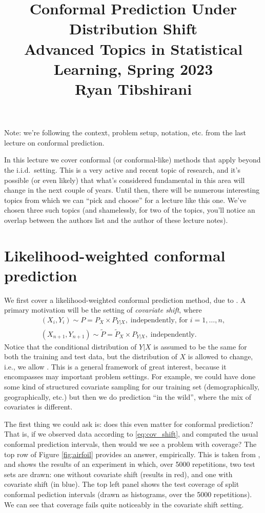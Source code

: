 \documentclass{article}
\title{Conformal Prediction Under Distribution Shift \\ \smallskip
\large Advanced Topics in Statistical Learning, Spring 2023 \\ \smallskip
Ryan Tibshirani }
\date{}
\begin{document}
\maketitle
\RaggedRight
\vspace{-50pt}

Note: we're following the context, problem setup, notation, etc. from the last
lecture on conformal prediction.

In this lecture we cover conformal (or conformal-like) methods that apply beyond
the i.i.d.\ setting. This is a very active and recent topic of research, and
it's possible (or even likely) that what's considered fundamental in this area  
will change in the next couple of years. Until then, there will be numerous
interesting topics from which we can ``pick and choose'' for a lecture like this
one. We've chosen three such topics (and shamelessly, for two of the topics,
you'll notice an overlap between the authors list and the author of these
lecture notes).  

\section{Likelihood-weighted conformal prediction}

We first cover a likelihood-weighted conformal prediction method, due to
\citet{tibshirani2019conformal}. A primary motivation will be the setting of  
\emph{covariate shift}, where 
\begin{equation}
\label{eq:cov_shift}
\begin{gathered}
(X_i, Y_i) \sim P = P_X \times P_{Y|X}, \; \text{independently, for
  $i=1,\dots,n$} , \\
(X_{n+1}, Y_{n+1}) \sim \widetilde{P} = \widetilde{P}_X \times P_{Y|X}, \;
\text{independently}.
\end{gathered}
\end{equation}
Notice that the conditional distribution of $Y|X$ is assumed to be the same for 
both the training and test data, but the distribution of $X$ is allowed to
change, i.e., we allow . This is a general
framework of great interest, because it encompasses may important problem
settings. For example, we could have done some kind of structured covariate
sampling for our training set (demographically, geographically, etc.) but then
we do prediction ``in the wild'', where the mix of covariates is different.

The first thing we could ask is: does this even matter for conformal prediction?
That is, if we observed data according to \eqref{eq:cov_shift}, and computed the 
usual conformal prediction intervals, then would we see a problem with coverage?
The top row of Figure \ref{fig:airfoil} provides an answer, empirically. This is 
taken from \citet{tibshirani2019conformal}, and shows the results of an
experiment in which, over 5000 repetitions, two test sets are drawn: one without  
covariate shift (results in red), and one with covariate shift (in blue). The
top left panel shows the test coverage of split conformal pediction intervals
(drawn as histograms, over the 5000 repetitions). We can see that coverage fails
quite noticeably in the covariate shift setting.
\end{document}
